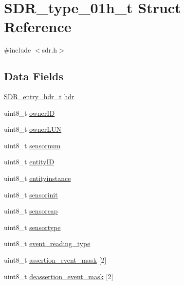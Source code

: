 \hypertarget{structSDR__type__01h__t}{\section{S\-D\-R\-\_\-type\-\_\-01h\-\_\-t Struct Reference}
\label{structSDR__type__01h__t}
}


{\ttfamily \#include $<$sdr.\-h$>$}

\subsection*{Data Fields}
\begin{DoxyCompactItemize}
\item 
\hyperlink{structSDR__entry__hdr__t}{S\-D\-R\-\_\-entry\-\_\-hdr\-\_\-t} \hyperlink{structSDR__type__01h__t_a6f62057f86239bde5832db6b6bf5015e}{hdr}
\item 
uint8\-\_\-t \hyperlink{structSDR__type__01h__t_a20382093dabbbc5b25768628b552712c}{owner\-I\-D}
\item 
uint8\-\_\-t \hyperlink{structSDR__type__01h__t_ab14d5fc600bd0739afb3cb73ee9791b6}{owner\-L\-U\-N}
\item 
uint8\-\_\-t \hyperlink{structSDR__type__01h__t_ae490f3f60ae5da4aed7ff19d6f6bdcc7}{sensornum}
\item 
uint8\-\_\-t \hyperlink{structSDR__type__01h__t_aac368e04b10337ea891151a1e444cf7b}{entity\-I\-D}
\item 
uint8\-\_\-t \hyperlink{structSDR__type__01h__t_a4ccc3fb129e9dad9e5f64884615e88e3}{entityinstance}
\item 
uint8\-\_\-t \hyperlink{structSDR__type__01h__t_a21865b16f76ac745400be5c7a5dc2760}{sensorinit}
\item 
uint8\-\_\-t \hyperlink{structSDR__type__01h__t_a77aa99838dfeca887d26d52707c9a8b5}{sensorcap}
\item 
uint8\-\_\-t \hyperlink{structSDR__type__01h__t_a2c4c941335e35ff7ffda0880e909553c}{sensortype}
\item 
uint8\-\_\-t \hyperlink{structSDR__type__01h__t_a54820fd078600d89124924dcb4d10df0}{event\-\_\-reading\-\_\-type}
\item 
uint8\-\_\-t \hyperlink{structSDR__type__01h__t_a1febd7fe8d97a8fb00a317646f0cc174}{assertion\-\_\-event\-\_\-mask} \mbox{[}2\mbox{]}
\item 
uint8\-\_\-t \hyperlink{structSDR__type__01h__t_ae6f8c8d00b8ceaa2afdaf624cb9d4004}{deassertion\-\_\-event\-\_\-mask} \mbox{[}2\mbox{]}

\end{DoxyCompactItemize}
